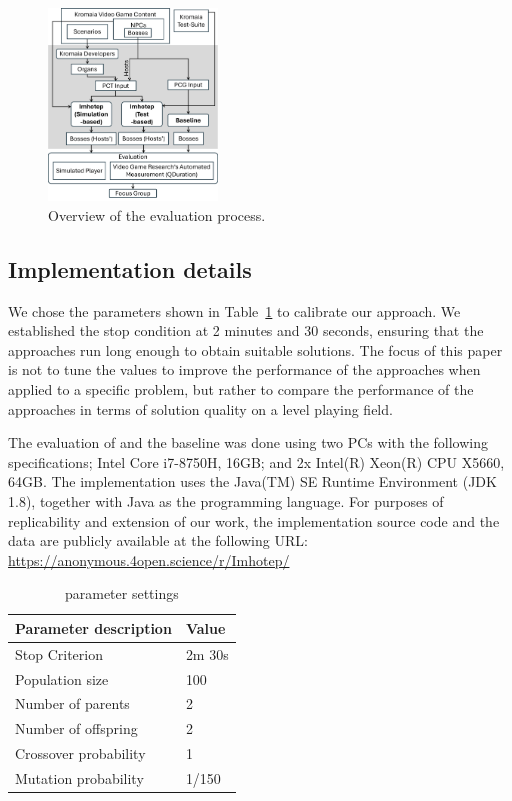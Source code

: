 \begin{figure}[h]
    \centering
    \includegraphics[width=0.4\textwidth]{Figures/evaluation_process.png}
    \caption{Overview of the evaluation process.}
    \label{fig:evaluation}
\end{figure}

\subsection{Implementation details}

We chose the parameters shown in Table~\ref{tab:evaluation_parameters} to calibrate our \ApproachName{} approach. We established the stop condition at 2 minutes and 30 seconds, ensuring that the approaches run long enough to obtain suitable solutions. The focus of this paper is not to tune the values to improve the performance of the approaches when applied to a specific problem, but rather to compare the performance of the approaches in terms of solution quality on a level playing field.

The evaluation of \ApproachName{} and the baseline was done using two PCs with the following specifications; Intel Core i7-8750H, 16GB; and  2x Intel(R) Xeon(R) CPU X5660, 64GB.
The implementation uses the Java(TM) SE Runtime Environment (JDK 1.8), together with Java as the programming language. 
For purposes of replicability and extension of our work, the implementation source code and the data are publicly available at the following URL: \url{https://anonymous.4open.science/r/Imhotep/}

\begin{table}[h]
    \centering    
    \caption{\ApproachName{} parameter settings}
    \begin{tabular}{ll}
        \hline
        \bf{Parameter description}            & \bf{Value}  \\ \hline
        Stop Criterion                   & 2m 30s \\
        Population size                  & 100    \\
        Number of parents                & 2      \\
        Number of offspring              & 2      \\
        Crossover probability            & 1      \\
        Mutation probability             & 1/150 \\ \hline
    \end{tabular}

    \label{tab:evaluation_parameters}
    \end{table}

